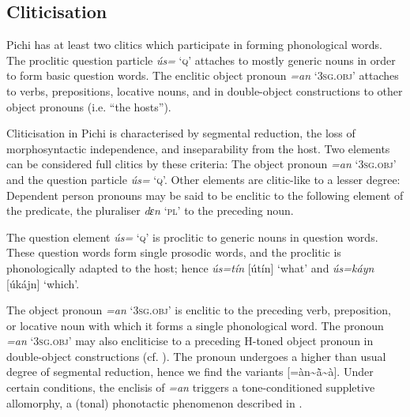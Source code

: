 \subsection{Cliticisation}\label{sec:2.6.3}

Pichi has at least two clitics which participate in forming phonological words. The proclitic question particle \textit{ús=} ‘\textsc{q}’ attaches to mostly generic nouns in order to form basic question words. The enclitic object pronoun \textit{=an} ‘\textsc{3sg.obj}’ attaches to verbs, prepositions, locative nouns, and in double-object constructions to other object pronouns (i.e. “the hosts”). 


Cliticisation in Pichi is characterised by segmental reduction, the loss of morphosyntactic independence, and inseparability from the host. Two elements can be considered full clitics by these criteria: The object pronoun \textit{=an} ‘\textsc{3sg.obj}’ and the question particle \textit{ús=} ‘\textsc{q}’. Other elements are clitic-like to a lesser degree: Dependent person pronouns may be said to be enclitic to the following element of the predicate, the pluraliser \textit{dɛn} ‘\textsc{pl}’ to the preceding noun.



The question element \textit{ús=} ‘\textsc{q}’ is proclitic to generic nouns in question words. These question words form single prosodic words, and the proclitic is phonologically adapted to the host; hence \textit{ús=tín} [útín] ‘what’ and \textit{ús=káyn} [úkájn] ‘which’.



The object pronoun \textit{=an} ‘\textsc{3sg.obj}’ is enclitic to the preceding verb, preposition, or locative noun  with which it forms a single phonological word. The pronoun \textit{=an} ‘\textsc{3sg.obj}’ may also encliticise to a preceding H-toned object pronoun in double-object constructions (cf. ). The pronoun undergoes a higher than usual degree of segmental reduction, hence we find the variants [=àn{\textasciitilde}ã̀{\textasciitilde}à]. Under certain conditions, the enclisis of \textit{=an} triggers a tone-conditioned suppletive allomorphy, a (tonal) phonotactic phenomenon described in .


